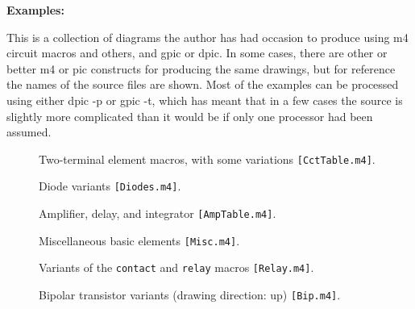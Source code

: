 \documentclass[11pt]{article}
\newcommand{\src}[1]{{\tt [#1]}}
\newcommand{\makepic}{\box\graph} %
\begin{document}
  \hfill
  {\large\bf Examples:
    }
  \hfill\break

  This is a collection of diagrams the author has had occasion to
  produce using m4 circuit macros and others, and gpic or dpic.  In
  some cases, there are other or better m4 or pic constructs for
  producing the same drawings, but for reference the names of the
  source files are shown.  Most of the examples can be processed using
  either dpic -p or gpic -t, which has meant that in a few cases the
  source is slightly more complicated than it would be if only one
  processor had been assumed.


% 

  \begin{figure}[h!t]
    \centerline{ \makepic}
    \caption{Two-terminal element macros, with some variations
    \src{CctTable.m4}.}
  \end{figure}

  \begin{figure}[h!t]
    \centerline{ \makepic}
    \caption{Diode variants
    \src{Diodes.m4}.}
  \end{figure}

  \begin{figure}[h!t]
    \centerline{ \makepic}
    \caption{Amplifier, delay, and integrator
    \src{AmpTable.m4}.}
  \end{figure}

  \begin{figure}[h!t]
    {\small\centerline{ \makepic} }
    \caption{Miscellaneous basic elements
    \src{Misc.m4}.}
  \end{figure}

  \begin{figure}[h!t]
    \centerline{ \makepic}
    \caption{Variants of the {\tt contact} and {\tt relay} macros
    \src{Relay.m4}.}
  \end{figure}

  \begin{figure}[h!t]
    \centerline{ \makepic}
    \caption{Bipolar transistor variants (drawing direction: up)
    \src{Bip.m4}.}
  \end{figure}
\end{document}
